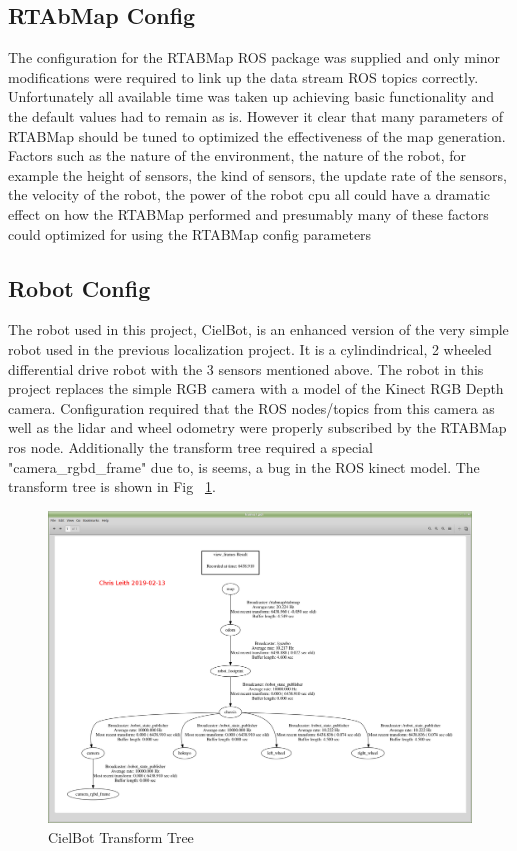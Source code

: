\documentclass[10pt,journal,compsoc]{IEEEtran}
\begin{document}
\subsection{RTAbMap Config}
 The configuration for the RTABMap ROS package was supplied and only minor modifications were required to link up the data stream ROS topics correctly. Unfortunately all available time was taken up achieving basic functionality and the default values had to remain as is. However it clear that many parameters of RTABMap should be tuned to optimized the effectiveness of the map generation. Factors such as the nature of the environment, the nature of the robot, for example the height of sensors, the kind of sensors, the update rate of the sensors, the velocity of the robot, the power of the robot cpu all could have a dramatic effect on how the RTABMap performed and presumably many of these factors could optimized for using the RTABMap config parameters
  
\subsection{Robot Config}
The robot used in this project, CielBot, is an enhanced version of the very simple robot used in the previous localization project. It is a cylindindrical, 2 wheeled differential drive robot with the 3 sensors mentioned above. The robot in this project replaces the simple RGB camera with a model of the Kinect RGB Depth camera. Configuration required that the ROS nodes/topics from this camera as well as the lidar and wheel odometry were properly subscribed by the RTABMap ros node.
Additionally the transform tree required a special "camera\_rgbd\_frame" due to, is seems, a bug in the ROS kinect model. The transform tree is shown in Fig ~\ref{fig:tftree}.

\begin{figure}[h]
      \centering
      \includegraphics[width=\linewidth]{Assets/Frames1_ScreenShot_2019-02-12_16-25-23.png}
      \caption{CielBot Transform Tree}
      \label{fig:tftree}
\end{figure}
\end{document}
